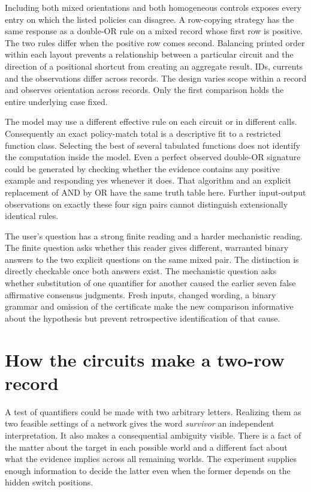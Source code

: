 \documentclass[12pt,letterpaper]{article}
\begin{document}
Including both mixed orientations and both homogeneous controls exposes every entry on which the listed policies can disagree. A row-copying strategy has the same response as a double-OR rule on a mixed record whose first row is positive. The two rules differ when the positive row comes second. Balancing printed order within each layout prevents a relationship between a particular circuit and the direction of a positional shortcut from creating an aggregate result. IDs, currents and the observations differ across records. The design varies scope within a record and observes orientation across records. Only the first comparison holds the entire underlying case fixed.

The model may use a different effective rule on each circuit or in different calls. Consequently an exact policy-match total is a descriptive fit to a restricted function class. Selecting the best of several tabulated functions does not identify the computation inside the model. Even a perfect observed double-OR signature could be generated by checking whether the evidence contains any positive example and responding yes whenever it does. That algorithm and an explicit replacement of AND by OR have the same truth table here. Further input-output observations on exactly these four sign pairs cannot distinguish extensionally identical rules.

The user's question has a strong finite reading and a harder mechanistic reading. The finite question asks whether this reader gives different, warranted binary answers to the two explicit questions on the same mixed pair. The distinction is directly checkable once both answers exist. The mechanistic question asks whether substitution of one quantifier for another caused the earlier seven false affirmative consensus judgments. Fresh inputs, changed wording, a binary grammar and omission of the certificate make the new comparison informative about the hypothesis but prevent retrospective identification of that cause.


\section{How the circuits make a two-row record}
A test of quantifiers could be made with two arbitrary letters. Realizing them as two feasible settings of a network gives the word \emph{survivor} an independent interpretation. It also makes a consequential ambiguity visible. There is a fact of the matter about the target in each possible world and a different fact about what the evidence implies across all remaining worlds. The experiment supplies enough information to decide the latter even when the former depends on the hidden switch positions.
\end{document}
